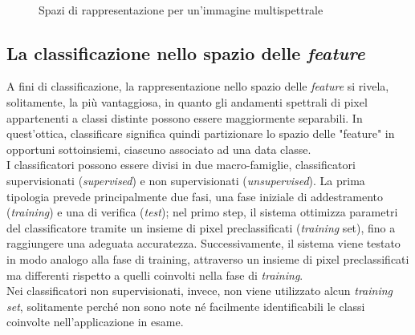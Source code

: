 \begin{figure}[!ht]
\center
{}
\hspace{3mm}
\\
\caption{Spazi di rappresentazione per un'immagine multispettrale}
\label{fig:spaziorappresentazione}
\end{figure}



\subsection{La classificazione nello spazio delle \emph{feature}}

A fini di classificazione, la rappresentazione nello spazio delle \emph{feature} si rivela, solitamente, la più vantaggiosa, in quanto gli andamenti spettrali di pixel appartenenti a classi distinte possono essere maggiormente separabili. In quest'ottica, classificare significa quindi partizionare lo spazio delle "feature" in opportuni sottoinsiemi, ciascuno associato ad una data classe.
\\

I classificatori possono essere divisi in due macro-famiglie, classificatori supervisionati (\emph{supervised}) e non supervisionati (\emph{unsupervised}). La prima tipologia prevede principalmente due fasi, una fase iniziale di addestramento (\emph{training}) e una di verifica (\emph{test}); nel primo step, il sistema ottimizza parametri del classificatore tramite un insieme di pixel preclassificati (\emph{training} set), fino a raggiungere una adeguata accuratezza. Successivamente, il sistema viene testato in modo analogo alla fase di training, attraverso un insieme di pixel preclassificati ma differenti rispetto a quelli coinvolti nella fase di \emph{training}.\\
Nei classificatori non supervisionati, invece, non viene utilizzato alcun \emph{training set}, solitamente perché non sono note né facilmente identificabili le classi coinvolte nell'applicazione in esame. 
\\


